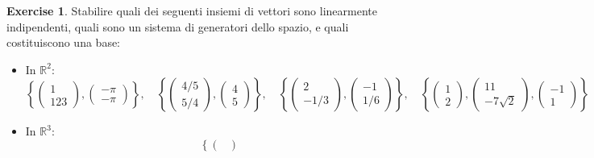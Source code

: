 \documentclass{article}
\theoremstyle{plain}
\theoremstyle{definition}
\newtheorem{xca}[exmp]{Exercise}
\theoremstyle{remark}
\begin{document}
\begin{bxthm}
\begin{xca}
    Stabilire quali dei seguenti insiemi di vettori sono linearmente indipendenti, quali sono un sistema di generatori dello spazio, e quali costituiscono una base:
    \begin{itemize}
        \item In $\mathbb{R}^2$:
            \[\left\{
            \begin{pmatrix}
                1\\
                123
            \end{pmatrix},
            \begin{pmatrix}
                -\pi\\
                -\pi
            \end{pmatrix}
            \right\},\quad \left\{
            \begin{pmatrix}
                4/5\\
                5/4
            \end{pmatrix},
            \begin{pmatrix}
                4\\
                5
            \end{pmatrix}
            \right\},\quad \left\{
            \begin{pmatrix}
                2\\
                -1/3
            \end{pmatrix},
            \begin{pmatrix}
                -1\\
                1/6
            \end{pmatrix}
            \right\},\quad \left\{
            \begin{pmatrix}
                1\\
                2
            \end{pmatrix},
            \begin{pmatrix}
                11\\
                -7\sqrt{2}
            \end{pmatrix},
            \begin{pmatrix}
                -1\\
                1
            \end{pmatrix}
            \right\}\]
        \item In $\mathbb{R}^3$:
        \[\left\{
            \begin{pmatrix}

\end{pmatrix}\]
\end{itemize}
\end{xca}
\end{bxthm}
\end{document}

